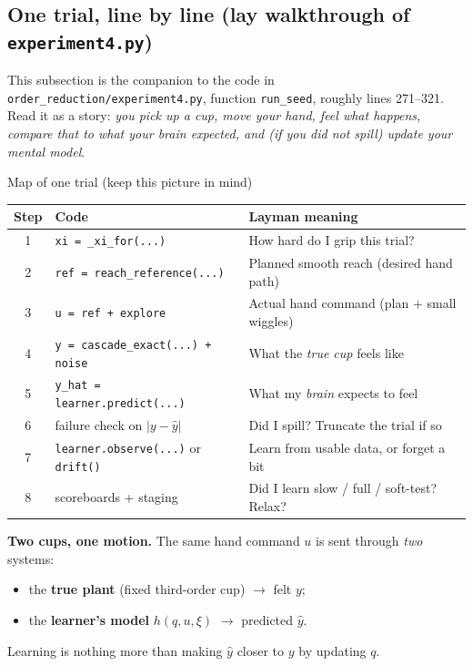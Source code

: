 \documentclass[11pt,a4paper]{article}
\begin{document}
\subsection{One trial, line by line (lay walkthrough of \texttt{experiment4.py})}
\label{sec:learner4trial}

This subsection is the companion to the code in
\texttt{order\_reduction/experiment4.py}, function \texttt{run\_seed},
roughly lines 271--321.  Read it as a story: \emph{you pick up a cup, move
your hand, feel what happens, compare that to what your brain expected, and
(if you did not spill) update your mental model}.

\begin{howto}{Map of one trial (keep this picture in mind)}
\begin{center}
\small
\begin{tabular}{@{}cll@{}}
\toprule
\textbf{Step} & \textbf{Code} & \textbf{Layman meaning} \\
\midrule
1 & \texttt{xi = \_xi\_for(...)} & How hard do I grip this trial? \\
2 & \texttt{ref = reach\_reference(...)} & Planned smooth reach (desired hand path) \\
3 & \texttt{u = ref + explore} & Actual hand command (plan + small wiggles) \\
4 & \texttt{y = cascade\_exact(...) + noise} & What the \emph{true cup} feels like \\
5 & \texttt{y\_hat = learner.predict(...)} & What my \emph{brain} expects to feel \\
6 & failure check on $|y-\hat y|$ & Did I spill? Truncate the trial if so \\
7 & \texttt{learner.observe(...)} or \texttt{drift()} & Learn from usable data, or forget a bit \\
8 & scoreboards + staging & Did I learn slow / full / soft-test? Relax? \\
\bottomrule
\end{tabular}
\end{center}

\textbf{Two cups, one motion.}  The same hand command $u$ is sent through
\emph{two} systems:
\begin{itemize}[nosep]
\item the \textbf{true plant} (fixed third-order cup) $\to$ felt $y$;
\item the \textbf{learner's model} $h(q,u,\xi)$ $\to$ predicted $\hat y$.
\end{itemize}
Learning is nothing more than making $\hat y$ closer to $y$ by updating $q$.
\end{howto}
\end{document}
